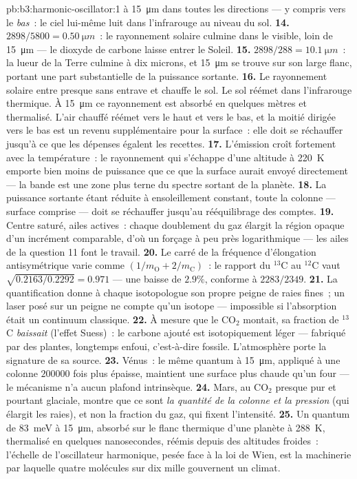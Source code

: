 \begin{solution}{pb:b3:harmonic-oscillator:1}
à \qty{15}{\micro m} dans toutes les directions --- y compris vers le
\emph{bas}~: le ciel lui-même luit dans l'infrarouge au niveau du sol.
\textbf{14.} $2898/5800 = \qty{0.50}{\micro m}$~: le rayonnement
solaire culmine dans le visible, loin de \qty{15}{\micro m} --- le
dioxyde de carbone laisse entrer le Soleil.
\textbf{15.} $2898/288 = \qty{10.1}{\micro m}$~: la lueur de la Terre
culmine à dix microns, et \qty{15}{\micro m} se trouve sur son large
flanc, portant une part substantielle de la puissance sortante.
\textbf{16.} Le rayonnement solaire entre presque sans entrave et
chauffe le sol. Le sol réémet dans l'infrarouge thermique. À
\qty{15}{\micro m} ce rayonnement est absorbé en quelques mètres et
thermalisé. L'air chauffé réémet vers le haut et vers le bas, et la
moitié dirigée vers le bas est un revenu supplémentaire pour la
surface~: elle doit se réchauffer jusqu'à ce que les dépenses égalent
les recettes.
\textbf{17.} L'émission croît fortement avec la température~: le
rayonnement qui s'échappe d'une altitude à \qty{220}{K} emporte bien
moins de puissance que ce que la surface aurait envoyé directement ---
la bande est une zone plus terne du spectre sortant de la planète.
\textbf{18.} La puissance sortante étant réduite à ensoleillement
constant, toute la colonne --- surface comprise --- doit se réchauffer
jusqu'au rééquilibrage des comptes.
\textbf{19.} Centre saturé, ailes actives~: chaque doublement du gaz
élargit la région opaque d'un incrément comparable, d'où un forçage à
peu près logarithmique --- les ailes de la question 11 font le
travail.
\textbf{20.} Le carré de la fréquence d'élongation antisymétrique
varie comme $(1/m_{
\text{O}} + 2/m_{\text{C}})$~: le rapport du $^{13}$C au $^{12}$C vaut
$\sqrt{0.2163/0.2292} = 0.971$ --- une baisse de $2.9\%$, conforme à
$2283/2349$.
\textbf{21.} La quantification donne à chaque isotopologue son propre
peigne de raies fines~; un laser posé sur un peigne ne compte qu'un
isotope --- impossible si l'absorption était un continuum classique.
\textbf{22.} À mesure que le CO$_2$ montait, sa fraction de $^{13}$C
\emph{baissait} (l'effet Suess)~: le carbone ajouté est isotopiquement
léger --- fabriqué par des plantes, longtemps enfoui, c'est-à-dire
fossile. L'atmosphère porte la signature de sa source.
\textbf{23.} Vénus~: le même quantum à \qty{15}{\micro m}, appliqué à
une colonne $200000$ fois plus épaisse, maintient une surface plus
chaude qu'un four --- le mécanisme n'a aucun plafond intrinsèque.
\textbf{24.} Mars, au CO$_2$ presque pur et pourtant glaciale, montre
que ce sont \emph{la quantité de la colonne et la pression} (qui
élargit les raies), et non la fraction du gaz, qui fixent l'intensité.
\textbf{25.} Un quantum de \qty{83}{meV} à \qty{15}{\micro m}, absorbé
sur le flanc thermique d'une planète à \qty{288}{K}, thermalisé en
quelques nanosecondes, réémis depuis des altitudes froides~: l'échelle
de l'oscillateur harmonique, pesée face à la loi de Wien, est la
machinerie par laquelle quatre molécules sur dix mille gouvernent un
climat.
\end{solution}
